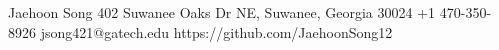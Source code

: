 % 
\begin{resume-header}{Jaehoon Song}
  {402 Suwanee Oaks Dr NE, Suwanee, Georgia 30024}
  {+1 470-350-8926}
  {jsong421@gatech.edu}
  {https://github.com/JaehoonSong12}
\end{resume-header}
